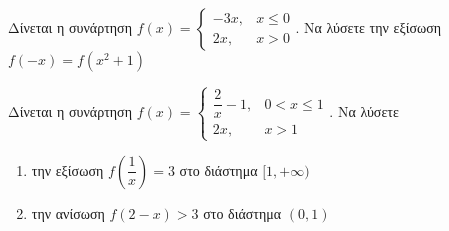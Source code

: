 \documentclass{../../presentation}
\begin{document}
\begin{askisi}
  Δίνεται η συνάρτηση $f(x)=\begin{cases}
      -3x, & x\le 0 \\
      2x,  & x > 0
    \end{cases}$. Να λύσετε την εξίσωση $f(-x)=f(x^2+1)$
\end{askisi}

\begin{askisi}
  Δίνεται η συνάρτηση $f(x)=\begin{cases}
      \dfrac{2}{x}-1, & 0<x\le 1 \\
      2x,             & x > 1
    \end{cases}$. Να λύσετε
  \begin{enumerate}[<+->]
    \item την εξίσωση $f\left(\dfrac{1}{x}\right)=3$ στο διάστημα $[1,+\infty)$
    \item την ανίσωση $f(2-x)>3$ στο διάστημα $(0,1)$
  \end{enumerate}
\end{askisi}
\end{document}
